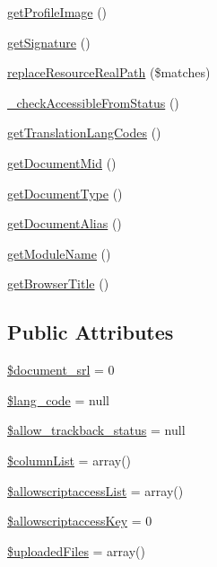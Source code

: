 \begin{DoxyCompactItemize}
\hyperlink{classdocumentItem_afb95c0b0d6d9106c737d8eeb51a3c834}{get\+Profile\+Image} ()
\item 
\hyperlink{classdocumentItem_a03b199ae0def81ea3a9067bbb0186f17}{get\+Signature} ()
\item 
\hyperlink{classdocumentItem_a47d377b1f8ae94615b363f4f00bc94fc}{replace\+Resource\+Real\+Path} (\$matches)
\item 
\hyperlink{classdocumentItem_a16bc4bb18f4e29b0244e647eb89e2f45}{\+\_\+check\+Accessible\+From\+Status} ()
\item 
\hyperlink{classdocumentItem_afd284f32681755444c28e93c14f55c28}{get\+Translation\+Lang\+Codes} ()
\item 
\hyperlink{classdocumentItem_ae8d90b15c65199e9acb4622b3da43119}{get\+Document\+Mid} ()
\item 
\hyperlink{classdocumentItem_a393ee98eeada92d1bd3b41f5018f746e}{get\+Document\+Type} ()
\item 
\hyperlink{classdocumentItem_adad3fafeaac19dfed4bea9e5709677d4}{get\+Document\+Alias} ()
\item 
\hyperlink{classdocumentItem_abc1a8bc25ecdbf936fba6e62b773b01c}{get\+Module\+Name} ()
\item 
\hyperlink{classdocumentItem_a386ced6121facbf9f54c2675afb8a037}{get\+Browser\+Title} ()
\end{DoxyCompactItemize}
\subsection*{Public Attributes}
\begin{DoxyCompactItemize}
\item 
\hyperlink{classdocumentItem_a87159d1cf24944d081646e6fe4f7e0f6}{\$document\+\_\+srl} = 0
\item 
\hyperlink{classdocumentItem_a5fa7aa5d52f248116250e95126e8ab87}{\$lang\+\_\+code} = null
\item 
\hyperlink{classdocumentItem_aaf08d80bedc01fc0fc0370677a4ba9cc}{\$allow\+\_\+trackback\+\_\+status} = null
\item 
\hyperlink{classdocumentItem_a244e1382304e15c5ae29e3311ef8e865}{\$column\+List} = array()
\item 
\hyperlink{classdocumentItem_a3b10cc840f3a20580d3ab2269ef24df3}{\$allowscriptaccess\+List} = array()
\item 
\hyperlink{classdocumentItem_ab4273ebe05df985235bf651d918bd4f8}{\$allowscriptaccess\+Key} = 0
\item 
\hyperlink{classdocumentItem_a70d4321ea0edfb6c1fb0775ced8a6b41}{\$uploaded\+Files} = array()
\end{DoxyCompactItemize}


